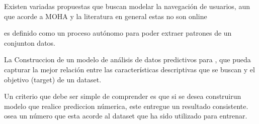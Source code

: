 Existen variadas propuestas que buscan modelar la navegación de usuarios, aun que acorde a MOHA y la literatura en general estas no son online


\machinelearning es definido como un proceso autónomo para poder extraer patrones de un conjunton datos.


La Construccion de un modelo de análisis de datos predictivos para \machinelearning, que pueda capturar  la mejor relación entre las características descriptivas que se buscan y el objetivo (target) de un dataset.

Un criterio que debe ser simple de comprender es que si se desea construirun modelo que realice prediccion númerica, este entregue un resultado consistente. osea un número que esta acorde al dataset que ha sido utilizado para entrenar.
